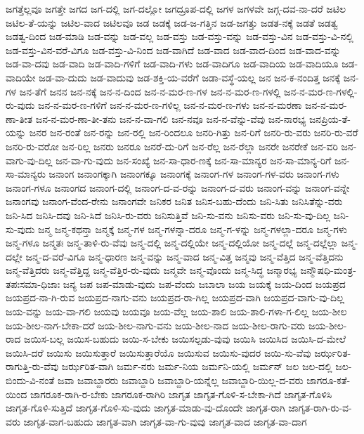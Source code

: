 {ಜಗತ್ತೆಲ್ಲವೂ
ಜಗತ್ತೇ
ಜಗದ
ಜಗ-ದಲ್ಲಿ
ಜಗ-ದಲ್ಲೋ
ಜಗದ್ರೂಪ-ದಲ್ಲಿ
ಜಗಳ
ಜಗಳವೇ
ಜಗ್ಗ-ದವ-ನಾ-ದರೆ
ಜಟಿಲ
ಜಟಿಲ-ತೆ-ಯನ್ನು
ಜಟಿಲ-ವಾದ
ಜಟಿಲವೂ
ಜಡ
ಜಡಕ್ಕೆ
ಜಡ-ಜ-ಗತ್ತಿನ
ಜಡ-ಜಗತ್ತು
ಜಡತ-ನಕ್ಕೆ
ಜಡತೆ
ಜಡತ್ವ
ಜಡತ್ವ-ದಿಂದ
ಜಡ-ಮಾಡಿ
ಜಡ-ವನ್ನು
ಜಡ-ವಲ್ಲ
ಜಡ-ವಸ್ತು
ಜಡ-ವಸ್ತು-ವನ್ನು
ಜಡ-ವಸ್ತು-ವಿನ
ಜಡ-ವಸ್ತು-ವಿ-ನಲ್ಲಿ
ಜಡ-ವಸ್ತು-ವಿನ-ವರೆ-ವಿಗೂ
ಜಡ-ವಸ್ತು-ವಿ-ನಿಂದ
ಜಡ-ವಾಗಿದೆ
ಜಡ-ವಾದ
ಜಡ-ವಾದ-ದಿಂದ
ಜಡ-ವಾದ-ವನ್ನು
ಜಡ-ವಾ-ದವು
ಜಡ-ವಾದಿ
ಜಡ-ವಾದಿ-ಗಳಿಗೆ
ಜಡ-ವಾದಿ-ಗಳು
ಜಡ-ವಾದಿಗೂ
ಜಡ-ವಾದಿಯ
ಜಡ-ವಾದಿಯೂ
ಜಡ-ವಾದಿಯೇ
ಜಡ-ವಾ-ದುದು
ಜಡ-ವಾದುವು
ಜಡ-ಶಕ್ತಿ-ಯ-ವರೆಗೆ
ಜಡಾ-ವಸ್ಥೆ-ಯಲ್ಲ
ಜನ
ಜನ-ಕ-ನಂದಿತ್ತ
ಜನಕ್ಕೆ
ಜನ-ಗಳ
ಜನ-ತೆಗೆ
ಜನನ
ಜನ-ನಕ್ಕೆ
ಜನ-ನ-ದಿಂದ
ಜನ-ನ-ಮರ-ಣ-ಗಳ
ಜನ-ನ-ಮರ-ಣ-ಗಳಲ್ಲಿ
ಜನ-ನ-ಮರ-ಣ-ಗಳಲ್ಲಿ-ರು-ವುದು
ಜನ-ನ-ಮರ-ಣ-ಗಳಿಗೆ
ಜನ-ನ-ಮರ-ಣ-ಗಳಿಲ್ಲ
ಜನ-ನ-ಮರ-ಣ-ಗಳು
ಜನ-ನ-ಮರಣಾ
ಜನ-ನ-ಮರ-ಣಾ-ತೀತ
ಜನ-ನ-ಮರ-ಣಾ-ತೀ-ತನು
ಜನ-ನ-ವಾ-ಗಲಿ
ಜನ-ನವೂ
ಜನ-ನ-ವೆನ್ನು-ವೆವು
ಜನ-ನಾರಭ್ಯ
ಜನಪ್ರಿಯ-ತೆ-ಯನ್ನು
ಜನರ
ಜನ-ರಂತೆ
ಜನ-ರನ್ನು
ಜನ-ರಲ್ಲಿ
ಜನ-ರಿಂದಲೂ
ಜನರಿ-ಗಿತ್ತು
ಜನ-ರಿಗೆ
ಜನರಿ-ರು-ವರು
ಜನರಿ-ರು-ವರೆ
ಜನರಿ-ರು-ವರೋ
ಜನ-ರಿಲ್ಲ
ಜನರು
ಜನರೂ
ಜನರೆ-ದು-ರಿಗೆ
ಜನ-ರೆಲ್ಲ
ಜನ-ರೆಲ್ಲಾ
ಜನರೇ
ಜನರೇಕೆ
ಜನ-ವರಿ
ಜನ-ವಾಗು-ವು-ದಿಲ್ಲ
ಜನ-ವಾ-ಗು-ವುದು
ಜನ-ಸಂಖ್ಯೆ
ಜನ-ಸಾ-ಧಾರ-ಣಕ್ಕೆ
ಜನ-ಸಾ-ಮಾನ್ಯರ
ಜನ-ಸಾ-ಮಾನ್ಯ-ರಿಗೆ
ಜನ-ಸಾ-ಮಾನ್ಯರು
ಜನಾಂಗ
ಜನಾಂಗಕ್ಕಾಗಿ
ಜನಾಂಗಕ್ಕೂ
ಜನಾಂಗಕ್ಕೆ
ಜನಾಂಗ-ಗಳ
ಜನಾಂಗ-ಗಳ-ವರು
ಜನಾಂಗ-ಗಳು
ಜನಾಂಗ-ಗಳೂ
ಜನಾಂಗದ
ಜನಾಂಗ-ದಲ್ಲಿ
ಜನಾಂಗ-ದ-ವ-ರನ್ನು
ಜನಾಂಗ-ದ-ವರು
ಜನಾಂಗ-ವನ್ನು
ಜನಾಂಗ-ವನ್ನೇ
ಜನಾಂಗವು
ಜನಾಂಗ-ವೆಂದ-ರೇನು
ಜನಾಂಗವೇ
ಜನಿಕರ
ಜನಿತ
ಜನಿಸ-ಬಹು-ದೆಂದು
ಜನಿ-ಸಿತು
ಜನಿಸಿತೆನ್ನು-ವರು
ಜನಿ-ಸಿದ
ಜನಿಸಿ-ದವು
ಜನಿ-ಸಿದೆ
ಜನಿಸಿ-ರು-ವರು
ಜನಿಸುತ್ತಿವೆ
ಜನಿ-ಸು-ವನು
ಜನಿಸು-ವರು
ಜನಿ-ಸು-ವು-ದಿಲ್ಲ
ಜನಿ-ಸು-ವುದು
ಜನ್ಮ
ಜನ್ಮ-ಕಥನ್ತಾ
ಜನ್ಮಕ್ಕೆ
ಜನ್ಮ-ಗಳ
ಜನ್ಮ-ಗಳನ್ನಾ-ದರೂ
ಜನ್ಮ-ಗ-ಳನ್ನು
ಜನ್ಮ-ಗಳಲ್ಲಾ-ದರೂ
ಜನ್ಮ-ಗಳು
ಜನ್ಮ-ಗಳೂ
ಜನ್ಮತಃ
ಜನ್ಮ-ತಾಳಿ-ರು-ವೆವು
ಜನ್ಮ-ದಲ್ಲಿ
ಜನ್ಮ-ದಲ್ಲಿಯೇ
ಜನ್ಮ-ದಲ್ಲಿಯೋ
ಜನ್ಮ-ದಲ್ಲೆ
ಜನ್ಮ-ದಲ್ಲೆಲ್ಲಾ
ಜನ್ಮ-ದಲ್ಲೇ
ಜನ್ಮ-ದ-ವರೆ-ವಿಗೂ
ಜನ್ಮ-ಧಾರಣ
ಜನ್ಮ-ವನ್ನು
ಜನ್ಮ-ವಾದ
ಜನ್ಮ-ವಿತ್ತ
ಜನ್ಮವು
ಜನ್ಮ-ವೆತ್ತಿದ
ಜನ್ಮ-ವೆತ್ತಿದನು
ಜನ್ಮ-ವೆತ್ತಿದರು
ಜನ್ಮ-ವೆತ್ತಿದ್ದ
ಜನ್ಮ-ವೆತ್ತಿರ-ರು-ವುದು
ಜನ್ಮವೇ
ಜನ್ಮ-ವೊಂದು
ಜನ್ಮ-ಸಿದ್ಧ
ಜನ್ಮಾರಭ್ಯ
ಜನ್ಮೌಷಧಿ-ಮಂತ್ರ-ತಪಃಸಮಾ-ಧಿಜಾಃ
ಜನ್ಯ
ಜಪ
ಜಪ-ಮಾಡು-ವುದು
ಜಪ-ವೆಂದು
ಜಬಾಲಾ
ಜಯ
ಜಯಕ್ಕೆ
ಜಯ-ದಿಂದ
ಜಯಪ್ರದ
ಜಯಪ್ರದ-ನಾ-ಗಿ-ರುವ
ಜಯಪ್ರದ-ನಾಗು-ವನು
ಜಯಪ್ರದ-ರಾ-ಗಿಲ್ಲ
ಜಯಪ್ರದ-ವಾಗಿ
ಜಯಪ್ರದ-ವಾಗು-ವು-ದಿಲ್ಲ
ಜಯ-ವನ್ನು
ಜಯ-ವಾ-ಗಲಿ
ಜಯವು
ಜಯವೂ
ಜಯ-ವೆಲ್ಲ
ಜಯ-ಶಾಲಿ
ಜಯ-ಶಾಲಿ-ಗಳಾ-ಗ-ಲಿಲ್ಲ
ಜಯ-ಶೀಲ
ಜಯ-ಶೀಲ-ನಾಗ-ಬೇಕಾ-ದರೆ
ಜಯ-ಶೀಲ-ನಾಗು-ವನು
ಜಯ-ಶೀಲ-ನಾದ
ಜಯ-ಶೀಲ-ರಾಗು-ವರು
ಜಯ-ಶೀಲ-ರಾದ
ಜಯಿಸ-ಬಲ್ಲ
ಜಯಿಸ-ಬಹುದು
ಜಯಿ-ಸ-ಬೇಕು
ಜಯಿಸಲ್ಪಡು-ವುವು
ಜಯಿಸಿ
ಜಯಿಸಿದ
ಜಯಿಸಿ-ದ-ಮೇಲೆ
ಜಯಿಸಿ-ದರೆ
ಜಯಿಸು
ಜಯಿಸುತ್ತಾರೆ
ಜಯಿಸುತ್ತಾರೆಯೊ
ಜಯಿಸುವ
ಜಯಿಸು-ವುದರ
ಜಯಿ-ಸು-ವೆವು
ಜರ್ಝರಿತ-ರಾಗುತ್ತಿ-ರು-ವೆವು
ಜರ್ಝರಿತ-ವಾಗಿ
ಜರ್ಮ-ನರು
ಜರ್ಮ-ನಿಯ
ಜರ್ಮನಿ-ಯಲ್ಲಿ
ಜರ್ಮನ್
ಜಲ
ಜಲ-ದಲ್ಲಿ
ಜಲ-ಬಿಂದು-ವಿ-ನಂತೆ
ಜವಾ
ಜವಾಬ್ದಾರರು
ಜವಾಬ್ದಾರಿ
ಜವಾಬ್ದಾರಿ-ಯನ್ನೆಲ್ಲ
ಜವಾಬ್ದಾರಿ-ಯಿಲ್ಲ-ದ-ವರು
ಜಾಗರೂ-ಕತೆ-ಯಿಂದ
ಜಾಗರೂಕ-ರಾಗಿ-ರ-ಬೇಕು
ಜಾಗರೂಕ-ರಾಗಿರಿ
ಜಾಗೃತ
ಜಾಗೃತ-ಗೊಳಿ-ಸ-ಬೇಕಾ-ಗಿದೆ
ಜಾಗೃತ-ಗೊಳಿಸಿ
ಜಾಗೃತ-ಗೊಳಿ-ಸುತ್ತಿದೆ
ಜಾಗೃತ-ಗೊಳಿ-ಸು-ವುದು
ಜಾಗೃತ-ಮಾಡು-ವು-ದೊಂದೇ
ಜಾಗೃತ-ರಾಗಿ
ಜಾಗೃತ-ರಾಗಿ-ರು-ವ-ವರು
ಜಾಗೃತ-ವಾಗ-ಬಹುದು
ಜಾಗೃತ-ವಾಗಿ
ಜಾಗೃತ-ವಾ-ಗು-ವುವು
ಜಾಗೃತ-ವಾದ
ಜಾಗೃತ-ವಾ-ದಾಗ
}
